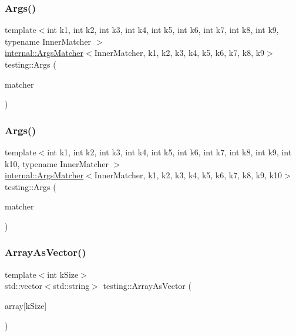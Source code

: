 \subsubsection{\texorpdfstring{Args()}{Args()}\hspace{0.1cm}{\footnotesize\ttfamily [10/11]}}
{\footnotesize\ttfamily template$<$int k1, int k2, int k3, int k4, int k5, int k6, int k7, int k8, int k9, typename Inner\+Matcher $>$ \\
\hyperlink{classtesting_1_1internal_1_1_args_matcher}{internal\+::\+Args\+Matcher}$<$Inner\+Matcher, k1, k2, k3, k4, k5, k6, k7, k8, k9$>$ testing\+::\+Args (\begin{DoxyParamCaption}\item[{const Inner\+Matcher \&}]{matcher }\end{DoxyParamCaption})\hspace{0.3cm}{\ttfamily [inline]}}

\mbox{\label{namespacetesting_a09ac462e8d6ed468cbfaa9c767aee0aa}} 
\subsubsection{\texorpdfstring{Args()}{Args()}\hspace{0.1cm}{\footnotesize\ttfamily [11/11]}}
{\footnotesize\ttfamily template$<$int k1, int k2, int k3, int k4, int k5, int k6, int k7, int k8, int k9, int k10, typename Inner\+Matcher $>$ \\
\hyperlink{classtesting_1_1internal_1_1_args_matcher}{internal\+::\+Args\+Matcher}$<$Inner\+Matcher, k1, k2, k3, k4, k5, k6, k7, k8, k9, k10$>$ testing\+::\+Args (\begin{DoxyParamCaption}\item[{const Inner\+Matcher \&}]{matcher }\end{DoxyParamCaption})\hspace{0.3cm}{\ttfamily [inline]}}

\mbox{\label{namespacetesting_a956d4c522454fa6dfd75b5bbbefe8f9e}} 
\subsubsection{\texorpdfstring{Array\+As\+Vector()}{ArrayAsVector()}}
{\footnotesize\ttfamily template$<$int k\+Size$>$ \\
std\+::vector$<$std\+::string$>$ testing\+::\+Array\+As\+Vector (\begin{DoxyParamCaption}\item[{const char $\ast$const (\&)}]{array\mbox{[}k\+Size\mbox{]} }\end{DoxyParamCaption})}

